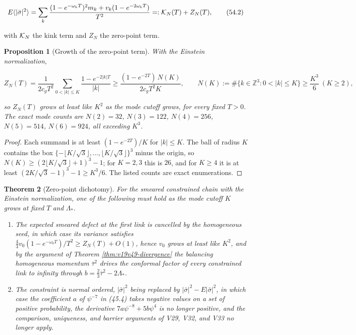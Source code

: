 \documentclass[11pt]{article}
\newtheorem{theorem}{Theorem}[section]
\newtheorem{proposition}[theorem]{Proposition}
\theoremstyle{remark}
\begin{document}
\[
 E\langle|\bar\sigma|^2\rangle
 =\sum_k\frac{(1-e^{-\omega_kT})^2m_k+v_k(1-e^{-2\omega_kT})}{T^2}
 =:{\cal K}_N(T)+Z_N(T),                                              \tag{54.2}
\]

with \({\cal K}_N\) the kink term and \(Z_N\) the zero-point term.

\begin{proposition}[Growth of the zero-point term]
\label{prop:v19v51-growth}
With the Einstein normalization,

\[
 Z_N(T)=\frac1{2c_gT^2}\sum_{0<|k|\leq K}\frac{1-e^{-2|k|T}}{|k|}
 \geq\frac{(1-e^{-2T})\,N(K)}{2c_gT^2K},
 \qquad N(K):=\#\{k\in\mathbb Z^3:0<|k|\leq K\}\geq\frac{K^3}6\ (K\geq2),
                                                                    \tag{54.3}
\]

so \(Z_N(T)\) grows at least like \(K^2\) as the mode cutoff grows,
for every fixed \(T>0\).  The exact mode counts are
\(N(2)=32\), \(N(3)=122\), \(N(4)=256\), \(N(5)=514\), \(N(6)=924\),
all exceeding \(K^3\).
\end{proposition}

\begin{proof}
Each summand is at least \((1-e^{-2T})/K\) for \(|k|\leq K\).  The
ball of radius \(K\) contains the box
\(\{-\lfloor K/\sqrt3\rfloor,\dots,\lfloor K/\sqrt3\rfloor\}^3\) minus
the origin, so \(N(K)\geq(2\lfloor K/\sqrt3\rfloor+1)^3-1\); for
\(K=2,3\) this is \(26\), and for \(K\geq4\) it is at least
\((2K/\sqrt3-1)^3-1\geq K^3/6\).  The listed counts are exact
enumerations.
\end{proof}

\begin{theorem}[Zero-point dichotomy]
\label{thm:v19v51-dichotomy}
For the smeared constrained chain with the Einstein normalization, one
of the following must hold as the mode cutoff \(K\) grows at fixed
\(T\) and \(\Lambda_*\).
\begin{enumerate}
\item The expected smeared defect at the first link is cancelled by the
      homogeneous seed, in which case its variance satisfies
      \(\tfrac43v_0(1-e^{-\omega_0T})/T^2\geq Z_N(T)+O(1)\), hence
      \(v_0\) grows at least like \(K^2\), and by the argument of
      Theorem \ref{thm:v19v49-divergence} the balancing homogeneous
      momentum \(\bar\tau^2\) drives the conformal factor of every
      constrained link to infinity through \(b=\tfrac23\bar\tau^2-2\Lambda_*\).
\item The constraint is normal ordered, \(|\bar\sigma|^2\) being
      replaced by \(|\bar\sigma|^2-E|\bar\sigma|^2\), in which case the
      coefficient \(a\) of \(\psi^{-7}\) in (45.4) takes negative values
      on a set of positive probability, the derivative
      \(7a\psi^{-8}+5b\psi^4\) is no longer positive, and the
      comparison, uniqueness, and barrier arguments of V29, V32, and
      V33 no longer apply.
\end{enumerate}
\end{theorem}
\end{document}
